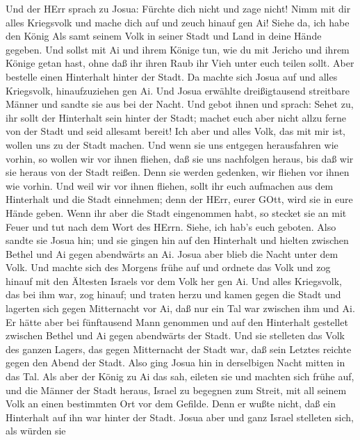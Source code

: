  Und der HErr sprach zu Josua: Fürchte dich nicht und zage
nicht! Nimm mit dir alles Kriegsvolk und mache dich auf und zeuch hinauf
gen Ai! Siehe da, ich habe den König Als samt seinem Volk in seiner
Stadt und Land in deine Hände gegeben.  Und sollst mit Ai
und ihrem Könige tun, wie du mit Jericho und ihrem Könige getan hast,
ohne daß ihr ihren Raub ihr Vieh unter euch teilen sollt. Aber bestelle
einen Hinterhalt hinter der Stadt.  Da machte sich Josua auf
und alles Kriegsvolk, hinaufzuziehen gen Ai. Und Josua erwählte
dreißigtausend streitbare Männer und sandte sie aus bei der Nacht.
 Und gebot ihnen und sprach: Sehet zu, ihr sollt der
Hinterhalt sein hinter der Stadt; machet euch aber nicht allzu ferne von
der Stadt und seid allesamt bereit!  Ich aber und alles
Volk, das mit mir ist, wollen uns zu der Stadt machen. Und wenn sie uns
entgegen herausfahren wie vorhin, so wollen wir vor ihnen fliehen,
 daß sie uns nachfolgen heraus, bis daß wir sie heraus von
der Stadt reißen. Denn sie werden gedenken, wir fliehen vor ihnen wie
vorhin. Und weil wir vor ihnen fliehen,  sollt ihr euch
aufmachen aus dem Hinterhalt und die Stadt einnehmen; denn der HErr,
eurer GOtt, wird sie in eure Hände geben.  Wenn ihr aber die
Stadt eingenommen habt, so stecket sie an mit Feuer und tut nach dem
Wort des HErrn. Siehe, ich hab's euch geboten.  Also sandte
sie Josua hin; und sie gingen hin auf den Hinterhalt und hielten
zwischen Bethel und Ai gegen abendwärts an Ai. Josua aber blieb die
Nacht unter dem Volk.  Und machte sich des Morgens frühe
auf und ordnete das Volk und zog hinauf mit den Ältesten Israels vor dem
Volk her gen Ai.  Und alles Kriegsvolk, das bei ihm war,
zog hinauf; und traten herzu und kamen gegen die Stadt und lagerten sich
gegen Mitternacht vor Ai, daß nur ein Tal war zwischen ihm und Ai.
 Er hätte aber bei fünftausend Mann genommen und auf den
Hinterhalt gestellet zwischen Bethel und Ai gegen abendwärts der Stadt.
 Und sie stelleten das Volk des ganzen Lagers, das gegen
Mitternacht der Stadt war, daß sein Letztes reichte gegen den Abend der
Stadt. Also ging Josua hin in derselbigen Nacht mitten in das Tal.
 Als aber der König zu Ai das sah, eileten sie und machten
sich frühe auf, und die Männer der Stadt heraus, Israel zu begegnen zum
Streit, mit all seinem Volk an einen bestimmten Ort vor dem Gefilde.
Denn er wußte nicht, daß ein Hinterhalt auf ihn war hinter der Stadt.
 Josua aber und ganz Israel stelleten sich, als würden sie
